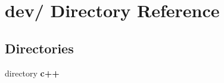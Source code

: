 \section{dev/ Directory Reference}
\label{dir_fdc37df15ae87b2a2d69183951b466b4}
\subsection*{Directories}
\begin{CompactItemize}
\item 
directory {\bf c++}
\end{CompactItemize}
